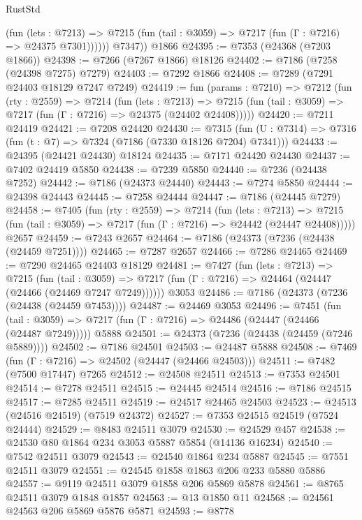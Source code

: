 \begin{lexlean}{RustStd}
\begin{coremodule}
              (fun (lets : @7213) =>
              @7215 (fun (tail : @3059) => @7217 (fun (Γ : @7216) => @24375 @7301))))))
        @7347))
    @1866
@24395 := @7353 (@24368 (@7203 @1866))
@24398 := @7266 (@7267 @1866) @18126
@24402 := @7186 (@7258 (@24398 @7275) @7279)
@24403 := @7292 @1866
@24408 := @7289 (@7291 @24403 @18129 @7247 @7249)
@24419 := fun (params : @7210) =>
  @7212
    (fun (rty : @2559) =>
    @7214
      (fun (lets : @7213) =>
      @7215 (fun (tail : @3059) => @7217 (fun (Γ : @7216) => @24375 (@24402 @24408)))))
@24420 := @7211 @24419
@24421 := @7208 @24420
@24430 := @7315
    (fun (U : @7314) => @7316 (fun (t : @7) => @7324 (@7186 (@7330 @18126 @7204) @7341)))
@24433 := @24395 (@24421 @24430) @18124
@24435 := @7171 @24420 @24430
@24437 := @7402 @24419 @5850
@24438 := @7239 @5850
@24440 := @7236 (@24438 @7252)
@24442 := @7186 (@24373 @24440)
@24443 := @7274 @5850
@24444 := @24398 @24443
@24445 := @7258 @24444
@24447 := @7186 (@24445 @7279)
@24458 := @7405
    (fun (rty : @2559) =>
    @7214
      (fun (lets : @7213) =>
      @7215 (fun (tail : @3059) => @7217 (fun (Γ : @7216) => @24442 (@24447 @24408)))))
    @2657
@24459 := @7243 @2657
@24464 := @7186 (@24373 (@7236 (@24438 (@24459 @7251))))
@24465 := @7287 @2657
@24466 := @7286 @24465
@24469 := @7290 @24465 @24403 @18129
@24481 := @7427
    (fun (lets : @7213) =>
    @7215
      (fun (tail : @3059) =>
      @7217 (fun (Γ : @7216) => @24464 (@24447 (@24466 (@24469 @7247 @7249))))))
    @3053
@24486 := @7186 (@24373 (@7236 (@24438 (@24459 @7453))))
@24487 := @24469 @3053
@24496 := @7451
    (fun (tail : @3059) => @7217 (fun (Γ : @7216) => @24486 (@24447 (@24466 (@24487 @7249)))))
    @5888
@24501 := @24373 (@7236 (@24438 (@24459 (@7246 @5889))))
@24502 := @7186 @24501
@24503 := @24487 @5888
@24508 := @7469 (fun (Γ : @7216) => @24502 (@24447 (@24466 @24503)))
@24511 := @7482 (@7500 @17447) @7265
@24512 := @24508 @24511
@24513 := @7353 @24501
@24514 := @7278 @24511
@24515 := @24445 @24514
@24516 := @7186 @24515
@24517 := @7285 @24511
@24519 := @24517 @24465 @24503
@24523 := @24513 (@24516 @24519) (@7519 @24372)
@24527 := @7353 @24515 @24519 (@7524 @24444)
@24529 := @8483 @24511 @3079
@24530 := @24529 @457
@24538 := @24530 @80 @1864 @234 @3053 @5887 @5854 (@14136 @16234)
@24540 := @7542 @24511 @3079
@24543 := @24540 @1864 @234 @5887
@24545 := @7551 @24511 @3079
@24551 := @24545 @1858 @1863 @206 @233 @5880 @5886
@24557 := @9119 @24511 @3079 @1858 @206 @5869 @5878
@24561 := @8765 @24511 @3079 @1848 @1857
@24563 := @13 @1850 @11
@24568 := @24561 @24563 @206 @5869 @5876 @5871
@24593 := @8778

\end{coremodule}
\end{lexlean}
